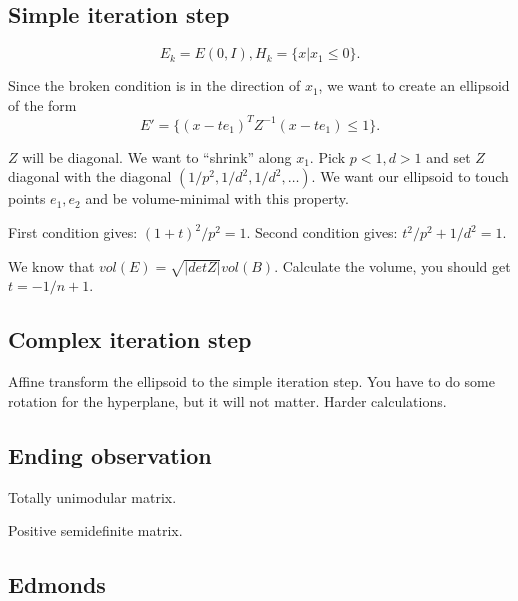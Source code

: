 \begin{multicols}{3}
\subsection{Simple iteration step}

\[E_k = E(0,I), H_k = \{x| x_1 \leq 0 \}.\]

Since the broken condition is in the direction of $x_1$, we want to create an ellipsoid of the form
\[E' = \{ (x - te_1)^T Z^{-1} (x - te_1) \leq 1 \}.\]

$Z$ will be diagonal. We want to ``shrink'' along $x_1$. Pick $p < 1, d > 1$ and set
$Z$ diagonal with the diagonal $(1/p^2, 1/d^2, 1/d^2, \dots)$. We want our ellipsoid
to touch points $e_1, e_2$ and be volume-minimal with this property.

First condition gives: $(1+t)^2 / p^2 = 1$.
Second condition gives: $t^2/p^2 + 1/d^2 = 1$.

We know that $vol(E) = \sqrt{|det Z|} vol (B)$. Calculate the volume, you should get
$t = -1/n+1$.

\subsection{Complex iteration step}

Affine transform the ellipsoid to the simple iteration step. You have to do
some rotation for the hyperplane, but it will not matter. Harder calculations.

\subsection{Ending observation}




Totally unimodular matrix.

Positive semidefinite matrix.


\bigskip

\bigskip


\subsection{Edmonds}


\end{multicols}

